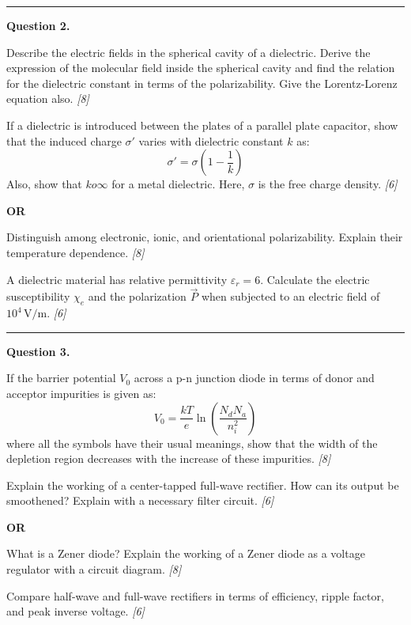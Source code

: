 \documentclass[11pt,a4paper]{article}
\newcommand{\pts}[1]{\hfill   \textit{[#1]}}
\begin{document}
\medskip\rule{\linewidth}{0.2pt}




\noindent   \textbf{Question 2.}

\begin{parts}
  \item Describe the electric fields in the spherical cavity of a dielectric. Derive the expression of the molecular field inside the spherical cavity and find the relation for the dielectric constant in terms of the polarizability. Give the Lorentz-Lorenz equation also. \pts{8}
  \item If a dielectric is introduced between the plates of a parallel plate capacitor, show that the induced charge $\sigma'$ varies with dielectric constant $k$ as:
    \[ \sigma' = \sigma \left( 1 - \frac{1}{k} \right) \]
    Also, show that $k  o \infty$ for a metal dielectric. Here, $\sigma$ is the free charge density. \pts{6}
\end{parts}
\hfill   \textbf{OR}

\begin{parts}
  \item Distinguish among electronic, ionic, and orientational polarizability. Explain their temperature dependence. \pts{8}
  \item A dielectric material has relative permittivity $\varepsilon_r = 6$. Calculate the electric susceptibility $\chi_e$ and the polarization $\vec{P}$ when subjected to an electric field of $10^4\, \text{V/m}$. \pts{6}
\end{parts}

\medskip\rule{\linewidth}{0.2pt}




\noindent   \textbf{Question 3.}

\begin{parts}
  \item If the barrier potential $V_0$ across a p-n junction diode in terms of donor and acceptor impurities is given as:
    \[ V_0 = \frac{kT}{e} \ln \left( \frac{N_d N_a}{n_i^2} \right) \]
    where all the symbols have their usual meanings, show that the width of the depletion region decreases with the increase of these impurities. \pts{8}
  \item Explain the working of a center-tapped full-wave rectifier. How can its output be smoothened? Explain with a necessary filter circuit. \pts{6}
\end{parts}
\hfill   \textbf{OR}

\begin{parts}
  \item What is a Zener diode? Explain the working of a Zener diode as a voltage regulator with a circuit diagram. \pts{8}
  \item Compare half-wave and full-wave rectifiers in terms of efficiency, ripple factor, and peak inverse voltage. \pts{6}
\end{parts}
\end{document}

